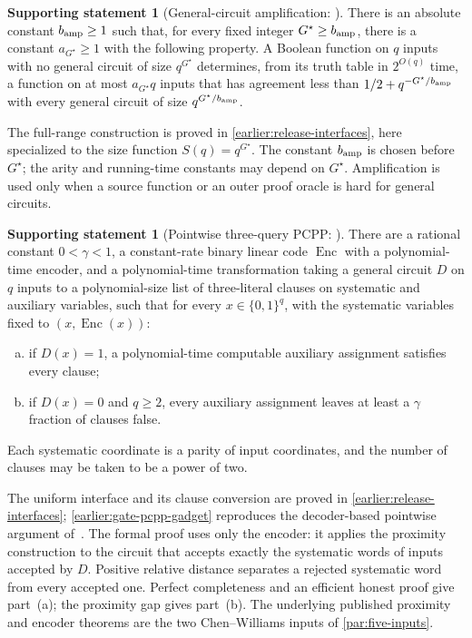 \documentclass[11pt,letterpaper]{article}
\theoremstyle{definition}
\newtheorem{imported}[theorem]{Supporting statement}
\theoremstyle{remark}
\begin{document}
\begin{imported}[General-circuit amplification: {\cite[Lemma~3.9]{CLW20}}]
\label{imp:transfer-amplification}
There is an absolute constant \(b_{\rm amp}\ge1\) such that, for
every fixed integer \(G^\star\ge b_{\rm amp}\), there is a constant
\(a_{G^\star}\ge1\) with the following property. A Boolean function
on \(q\) inputs with no general circuit of size \(q^{G^\star}\)
determines, from its truth table in \(2^{O(q)}\) time, a function
on at most \(a_{G^\star}q\) inputs that has agreement less than
\(1/2+q^{-G^\star/b_{\rm amp}}\) with every general circuit of
size \(q^{G^\star/b_{\rm amp}}\).
\end{imported}
The full-range construction is proved in
\cref{earlier:release-interfaces}, here specialized to the size function \(S(q)=q^{G^\star}\). The constant \(b_{\rm amp}\)
is chosen before \(G^\star\); the arity and running-time constants
may depend on \(G^\star\). Amplification is used only when a
source function or an outer proof oracle is hard for general circuits.

\begin{imported}[Pointwise three-query PCPP: {\cite[Lemma~24]{CW19}}]
\label{imp:transfer-pcpp}
There are a rational constant \(0<\gamma<1\), a constant-rate binary
linear code \(\operatorname{Enc}\) with a polynomial-time encoder,
and a polynomial-time transformation taking a general circuit
\(D\) on \(q\) inputs to a polynomial-size list of three-literal
clauses on systematic and auxiliary variables, such that for every
\(x\in\{0,1\}^q\), with the systematic variables fixed to
\((x,\operatorname{Enc}(x))\):
\begin{enumerate}[(a)]
\item if \(D(x)=1\), a polynomial-time computable auxiliary
assignment satisfies every clause;
\item if \(D(x)=0\) and \(q\ge2\), every auxiliary assignment
leaves at least a \(\gamma\) fraction of clauses false.
\end{enumerate}
Each systematic coordinate is a parity of input coordinates, and the
number of clauses may be taken to be a power of two.
\end{imported}
The uniform interface and its clause conversion are proved in
\cref{earlier:release-interfaces}; \cref{earlier:gate-pcpp-gadget} reproduces the decoder-based pointwise argument of~\cite{NagCG}. The formal proof uses only the encoder: it applies the proximity construction to the circuit that accepts
exactly the systematic words of inputs accepted by \(D\).
Positive relative distance separates a rejected systematic word from
every accepted one. Perfect completeness and an efficient honest
proof give part~(a); the proximity gap gives part~(b).
The underlying published proximity and encoder theorems are the two
Chen--Williams inputs of \cref{par:five-inputs}.
\end{document}
